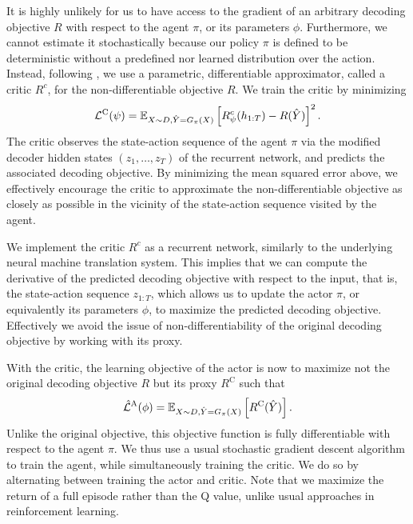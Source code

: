 It is highly unlikely for us to have access to the gradient of an arbitrary decoding objective $R$ with respect to the agent $\pi$, or its parameters $\phi$. Furthermore, we cannot estimate it stochastically because our policy $\pi$ is defined to be deterministic without a predefined nor learned distribution over the action. Instead, following \citep{silver2014deterministic,lillicrap2015continuous}, we use a parametric, differentiable approximator, called a critic $R^c$, for the non-differentiable objective $R$. We train the critic by minimizing
\begin{align}
\mathcal{L}^{\text{C}}(\psi) = \mathbb{E}_{X \sim D, \hat{Y}=G_{\pi}(X)}\left[R^c_{\psi}(h_{1:T}) - R(\hat{Y})\right]^2.
\end{align}
The critic observes the state-action sequence of the agent $\pi$ via the modified decoder hidden states $(z_1, \ldots, z_T)$ of the recurrent network, and predicts the associated decoding objective. By minimizing the mean squared error above, we effectively encourage the critic to approximate the non-differentiable objective as closely as possible in the vicinity of the state-action sequence visited by the agent. 

We implement the critic $R^c$ as a recurrent network, similarly to the underlying neural machine translation system. This implies that we can compute the derivative of the predicted decoding objective with respect to the input, that is, the state-action sequence $z_{1:T}$, which allows us to update the actor $\pi$, or equivalently its parameters $\phi$, to maximize the predicted decoding objective. Effectively we avoid the issue of non-differentiability of the original decoding objective by working with its proxy. 

With the critic, the learning objective of the actor is now to maximize not the original decoding objective $R$ but its proxy $R^{\text{C}}$ such that
\begin{align}
\hat{\mathcal{L}}^{\text{A}}(\phi) = \mathbb{E}_{X \sim D, \hat{Y}=G_{\pi}(X)}\left[R^{\text{C}}(\hat{Y})\right].
\end{align}
Unlike the original objective, this objective function is fully differentiable with respect to the agent $\pi$. We thus use a usual stochastic gradient descent algorithm to train the agent, while simultaneously training the critic. We do so by alternating between training the actor and critic. Note that we maximize the return of a full episode rather than the Q value, unlike usual approaches in reinforcement learning.







